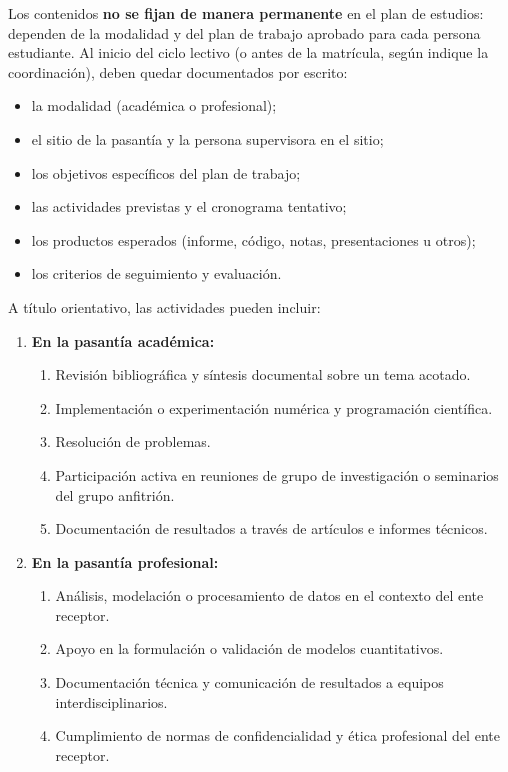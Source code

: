 \begin{refsection}
Los contenidos \textbf{no se fijan de manera permanente} en el plan de estudios: dependen de la modalidad y del plan de trabajo aprobado para cada persona estudiante. Al inicio del ciclo lectivo (o antes de la matrícula, según indique la coordinación), deben quedar documentados por escrito:

\begin{itemize}
\item la modalidad (académica o profesional);
\item el sitio de la pasantía y la persona supervisora en el sitio;
\item los objetivos específicos del plan de trabajo;
\item las actividades previstas y el cronograma tentativo;
\item los productos esperados (informe, código, notas, presentaciones u otros);
\item los criterios de seguimiento y evaluación.
\end{itemize}

A título orientativo, las actividades pueden incluir:

\begin{enumerate}
\item \textbf{En la pasantía académica:}
\begin{enumerate}
    \item Revisión bibliográfica y síntesis documental sobre un tema acotado.
    \item Implementación o experimentación numérica y programación científica.
    \item Resolución de problemas.
    \item Participación activa en reuniones de grupo de investigación o seminarios del grupo anfitrión.
    \item Documentación de resultados a través de artículos e informes técnicos.
\end{enumerate}

\item \textbf{En la pasantía profesional:}
\begin{enumerate}
    \item Análisis, modelación o procesamiento de datos en el contexto del ente receptor.
    \item Apoyo en la formulación o validación de modelos cuantitativos.
    \item Documentación técnica y comunicación de resultados a equipos interdisciplinarios.
    \item Cumplimiento de normas de confidencialidad y ética profesional del ente receptor.
\end{enumerate}
\end{enumerate}


\end{refsection}
